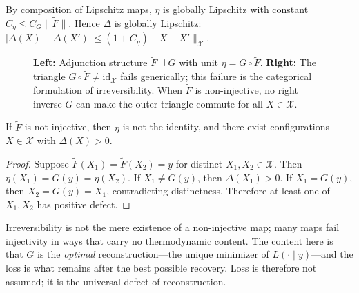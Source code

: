 \documentclass[12pt, oneside]{memoir}
\newcommand{\X}{\mathcal{X}}
\newcommand{\Ft}{\widetilde{F}}
\newcommand{\nnorm}[1]{\lVert #1 \rVert}
\begin{document}
By composition of Lipschitz maps, $\eta$ is globally Lipschitz with constant
$C_\eta \le C_G \nnorm{\Ft}$.  Hence $\Delta$ is globally Lipschitz:
$|\Delta(X) - \Delta(X')| \le (1 + C_\eta)\nnorm{X - X'}_\X$.

\begin{figure}[htbp]
\centering
{}
\qquad\qquad
{}
\caption{\textbf{Left:} Adjunction structure $\widetilde{F} \dashv G$ with unit
$\eta = G \circ \widetilde{F}$.  \textbf{Right:} The triangle $G \circ \widetilde{F}
\neq \mathrm{id}_\X$ fails generically; this failure is the categorical formulation of
irreversibility.  When $\widetilde{F}$ is non-injective, no right inverse $G$ can
make the outer triangle commute for all $X \in \X$.}
\label{fig:adjunction}
\end{figure}

\begin{theorem}
\label{thm:irrev}
If $\Ft$ is not injective, then $\eta$ is not the identity, and there exist configurations
$X \in \X$ with $\Delta(X) > 0$.
\end{theorem}

\begin{proof}
Suppose $\Ft(X_1) = \Ft(X_2) = y$ for distinct $X_1, X_2 \in \X$.  Then
$\eta(X_1) = G(y) = \eta(X_2)$.  If $X_1 \ne G(y)$, then $\Delta(X_1) > 0$.  If
$X_1 = G(y)$, then $X_2 = G(y) = X_1$, contradicting distinctness.  Therefore at least
one of $X_1, X_2$ has positive defect.
\end{proof}

\begin{remark}
Irreversibility is not the mere existence of a non-injective map; many maps fail
injectivity in ways that carry no thermodynamic content.  The content here is that $G$ is
the \emph{optimal} reconstruction---the unique minimizer of $L(\cdot \mid y)$---and the
loss is what remains after the best possible recovery.  Loss is therefore not assumed;
it is the universal defect of reconstruction.
\end{remark}
\end{document}
